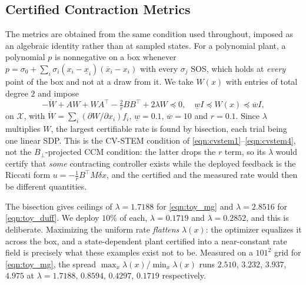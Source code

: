 \documentclass[lettersize,journal]{IEEEtran}
\begin{document}
\subsection{Certified Contraction Metrics}
The metrics are obtained from the same condition used throughout, imposed as an
algebraic identity rather than at sampled states. For a polynomial plant, a
polynomial $p$ is nonnegative on a box whenever
$p = \sigma_0 + \sum_i \sigma_i (x_i - \underline{x}_i)(\overline{x}_i - x_i)$
with every $\sigma_j$ SOS, which holds at \emph{every} point of the box and not
at a draw from it. We take $W(x)$ with entries of total degree $2$ and impose
\begin{equation}\label{eqn:toy_sos_lmi}
    -\dot W + AW + WA^\top - \tfrac{2}{r}BB^\top + 2\lambda W \preceq 0,
    \quad
    \underline{w}I \preceq W(x) \preceq \overline{w}I,
\end{equation}
on $\mathcal{X}$, with $\dot W = \sum_i (\partial W/\partial x_i) f_i$,
$\underline{w} = 0.1$, $\overline{w} = 10$ and $r = 0.1$. Since $\lambda$
multiplies $W$, the largest certifiable rate is found by bisection, each trial
being one linear SDP. This is the CV-STEM condition of
\eqref{eqn:cvstem1}--\eqref{eqn:cvstem4}, not the $B_\perp$-projected CCM
condition: the latter drops the $r$ term, so its $\lambda$ would certify that
\emph{some} contracting controller exists while the deployed feedback is the
Riccati form $u = -\tfrac{1}{r}B^\top M \delta x$, and the certified and the
measured rate would then be different quantities.

The bisection gives ceilings of $\lambda = 1.7188$ for \eqref{eqn:toy_mg} and
$\lambda = 2.8516$ for \eqref{eqn:toy_duff}. We deploy $10\%$ of each,
$\lambda = 0.1719$ and $\lambda = 0.2852$, and this is deliberate. Maximizing
the uniform rate \emph{flattens} $\lambda(x)$: the optimizer equalizes it across
the box, and a state-dependent plant certified into a near-constant rate field
is precisely what these examples exist not to be. Measured on a $101^2$ grid for
\eqref{eqn:toy_mg}, the spread $\max_x\lambda(x)/\min_x\lambda(x)$ runs
$2.510$, $3.232$, $3.937$, $4.975$ at $\lambda = 1.7188$, $0.8594$, $0.4297$,
$0.1719$ respectively.
\end{document}
